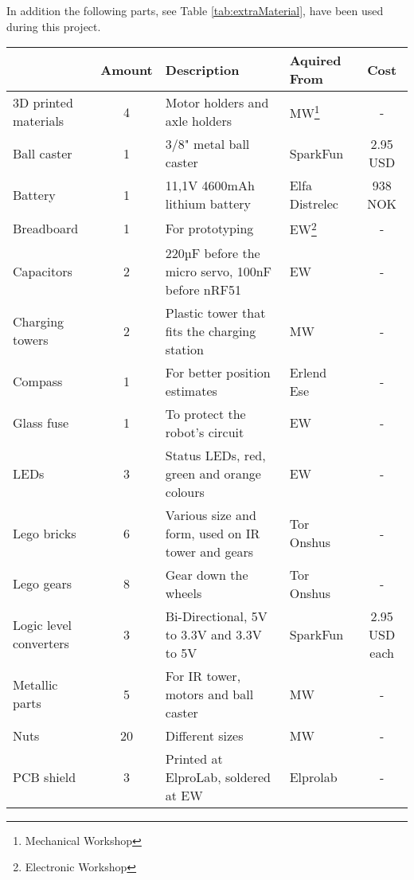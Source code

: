In addition the following parts, see Table \ref{tab:extraMaterial}, have been used during this project.

\begin{sidewaystable}[ht]
\centering
\caption{Extra Material}
\label{tab:extraMaterial}
\begin{tabular}{|l|c|l|l|c|}
\hline
\rowcolor[HTML]{C0C0C0} 
\multicolumn{1}{|l|}{\cellcolor[HTML]{C0C0C0}\textbf{Part}} & \multicolumn{1}{l|}{\cellcolor[HTML]{C0C0C0}\textbf{Amount}} & \multicolumn{1}{l|}{\cellcolor[HTML]{C0C0C0}\textbf{Description}} & \multicolumn{1}{l|}{\cellcolor[HTML]{C0C0C0}\textbf{Aquired From}} & \multicolumn{1}{c|}{\cellcolor[HTML]{C0C0C0}\textbf{Cost}} \\ \hline
3D printed materials & 4 & Motor  holders and axle holders & MW\footnote{Mechanical Workshop} & - \\
Ball caster & 1 & 3/8" metal ball caster & SparkFun & 2.95 USD \\
Battery & 1 & 11,1V 4600mAh lithium battery & Elfa Distrelec & 938 NOK \\
Breadboard & 1 & For prototyping & EW\footnote{Electronic Workshop} & - \\
Capacitors & 2 & 220µF before the micro servo, 100nF before nRF51 & EW & - \\
Charging towers & 2 & Plastic tower that fits the charging station & MW & - \\
Compass & 1 & For better position estimates & Erlend Ese & - \\
Glass fuse & 1 & To protect the robot's circuit & EW & - \\
LEDs & 3 & Status LEDs, red, green and orange colours & EW & - \\
Lego bricks & 6 & Various size and form, used on IR tower and gears & Tor Onshus & - \\
Lego gears & 8 & Gear down the wheels & Tor Onshus & - \\
Logic level converters & 3 & Bi-Directional, 5V to 3.3V and 3.3V to 5V & SparkFun & 2.95 USD each \\
Metallic parts & 5 & For IR tower, motors and ball caster & MW & - \\
Nuts & 20 & Different sizes & MW & - \\
PCB shield & 3 & Printed at ElproLab, soldered at EW & Elprolab & - \\

\end{tabular}
\end{sidewaystable}
